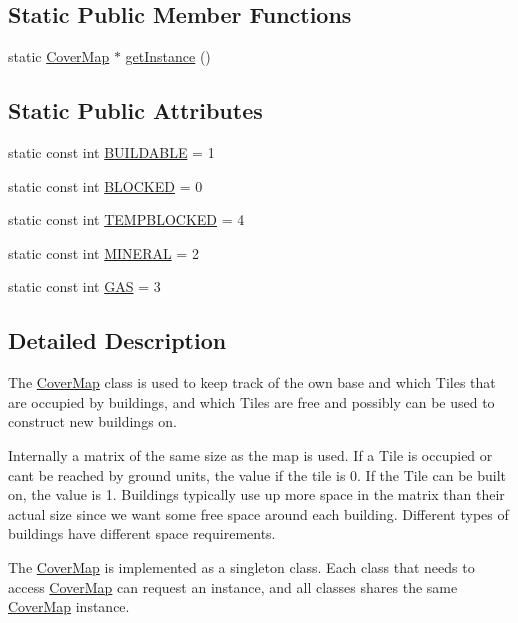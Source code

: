 \subsection*{Static Public Member Functions}
\begin{DoxyCompactItemize}
\item 
static \hyperlink{class_cover_map}{CoverMap} $\ast$ \hyperlink{class_cover_map_a31274aefb0aea800df900a6ce3fcb0a2}{getInstance} ()
\end{DoxyCompactItemize}
\subsection*{Static Public Attributes}
\begin{DoxyCompactItemize}
\item 
static const int \hyperlink{class_cover_map_a0d4d47ca7b4daf26d5eb421abb01a842}{BUILDABLE} = 1
\item 
static const int \hyperlink{class_cover_map_a39ca0fa62d0d64888eb11eea0885fa80}{BLOCKED} = 0
\item 
static const int \hyperlink{class_cover_map_a0dec904690c6527b04b0af293009e248}{TEMPBLOCKED} = 4
\item 
static const int \hyperlink{class_cover_map_a0e9b93904f0aa5af78b197cae5805911}{MINERAL} = 2
\item 
static const int \hyperlink{class_cover_map_a5a178427ea42b747890f537e9627beef}{GAS} = 3
\end{DoxyCompactItemize}


\subsection{Detailed Description}
The \hyperlink{class_cover_map}{CoverMap} class is used to keep track of the own base and which Tiles that are occupied by buildings, and which Tiles are free and possibly can be used to construct new buildings on.

Internally a matrix of the same size as the map is used. If a Tile is occupied or cant be reached by ground units, the value if the tile is 0. If the Tile can be built on, the value is 1. Buildings typically use up more space in the matrix than their actual size since we want some free space around each building. Different types of buildings have different space requirements.

The \hyperlink{class_cover_map}{CoverMap} is implemented as a singleton class. Each class that needs to access \hyperlink{class_cover_map}{CoverMap} can request an instance, and all classes shares the same \hyperlink{class_cover_map}{CoverMap} instance.

